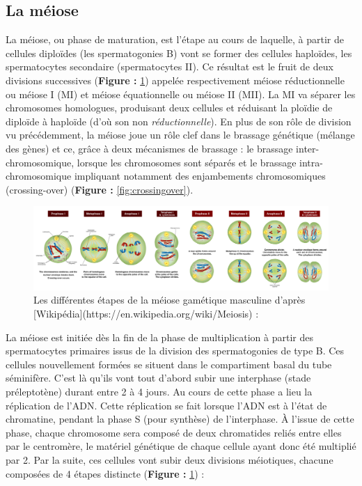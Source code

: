 \documentclass[12pt,twoside]{reedthesis}
\theoremstyle{definition}
\theoremstyle{definition}
\theoremstyle{remark}
\begin{document}
  \subsection{La méiose}\label{la-meiose}
  
  La méiose, ou phase de maturation, est l'étape au cours de laquelle, à
  partir de cellules diploïdes (les spermatogonies B) vont se former des
  cellules haploïdes, les spermatocytes secondaire (spermatocytes II). Ce
  résultat est le fruit de deux divisions successives (\textbf{Figure :
  }\ref{fig:meiose}) appelée respectivement méiose réductionnelle ou
  méiose I (MI) et méiose équationnelle ou méiose II (MII). La MI va
  séparer les chromosomes homologues, produisant deux cellules et
  réduisant la ploïdie de diploïde à haploïde (d'où son non
  \emph{réductionnelle}). En plus de son rôle de division vu précédemment,
  la méiose joue un rôle clef dans le brassage génétique (mélange des
  gènes) et ce, grâce à deux mécanismes de brassage : le brassage
  inter-chromosomique, lorsque les chromosomes sont séparés et le brassage
  intra-chromosomique impliquant notamment des enjambements chromosomiques
  (crossing-over) (\textbf{Figure : }\ref{fig:crossingover}).
  
  \begin{figure}
  
  {\centering \includegraphics[scale=0.23]{figure/Meiosis_Stages2} 
  
  }
  
  \caption[Les différentes étapes de la méiose gamétique masculine]{Les différentes étapes de la méiose gamétique masculine d'après [Wikipédia](https://en.wikipedia.org/wiki/Meiosis) : }\label{fig:meiose}
  \end{figure}
  
  La méiose est initiée dès la fin de la phase de multiplication à partir
  des spermatocytes primaires issus de la division des spermatogonies de
  type B. Ces cellules nouvellement formées se situent dans le
  compartiment basal du tube séminifère. C'est là qu'ils vont tout d'abord
  subir une interphase (stade préleptotène) durant entre 2 à 4 jours. Au
  cours de cette phase a lieu la réplication de l'ADN. Cette réplication
  se fait lorsque l'ADN est à l'état de chromatine, pendant la phase S
  (pour synthèse) de l'interphase. À l'issue de cette phase, chaque
  chromosome sera composé de deux chromatides reliés entre elles par le
  centromère, le matériel génétique de chaque cellule ayant donc été
  multiplié par 2. Par la suite, ces cellules vont subir deux divisions
  méiotiques, chacune composées de 4 étapes distincte (\textbf{Figure :
  }\ref{fig:meiose}) :
  
\end{document}

